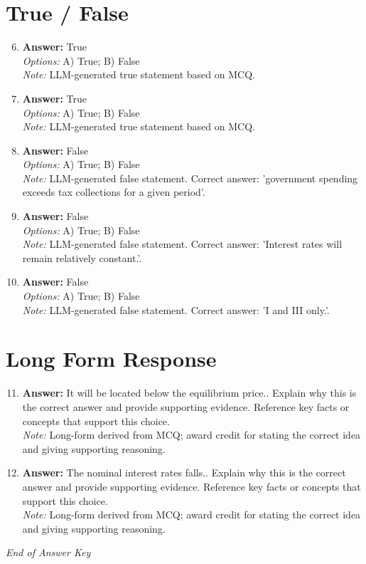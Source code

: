 \documentclass[12pt]{article}
\begin{document}
\section*{True / False}
\begin{enumerate}[label=\arabic*.]
\setcounter{enumi}{5}
\item \textbf{Answer:} True
\\ \textit{Options:} A) True; B) False
\\ \textit{Note:} LLM-generated true statement based on MCQ.
\item \textbf{Answer:} True
\\ \textit{Options:} A) True; B) False
\\ \textit{Note:} LLM-generated true statement based on MCQ.
\item \textbf{Answer:} False
\\ \textit{Options:} A) True; B) False
\\ \textit{Note:} LLM-generated false statement. Correct answer: 'government spending exceeds tax collections for a given period'.
\item \textbf{Answer:} False
\\ \textit{Options:} A) True; B) False
\\ \textit{Note:} LLM-generated false statement. Correct answer: 'Interest rates will remain relatively constant.'.
\item \textbf{Answer:} False
\\ \textit{Options:} A) True; B) False
\\ \textit{Note:} LLM-generated false statement. Correct answer: 'I and III only.'.
\end{enumerate}

\section*{Long Form Response}
\begin{enumerate}[label=\arabic*.]
\setcounter{enumi}{10}
\item \textbf{Answer:} It will be located below the equilibrium price.. Explain why this is the correct answer and provide supporting evidence. Reference key facts or concepts that support this choice.
\\ \textit{Note:} Long-form derived from MCQ; award credit for stating the correct idea and giving supporting reasoning.
\item \textbf{Answer:} The nominal interest rates falls.. Explain why this is the correct answer and provide supporting evidence. Reference key facts or concepts that support this choice.
\\ \textit{Note:} Long-form derived from MCQ; award credit for stating the correct idea and giving supporting reasoning.
\end{enumerate}

\vfill
\noindent\textit{End of Answer Key}
\end{document}
